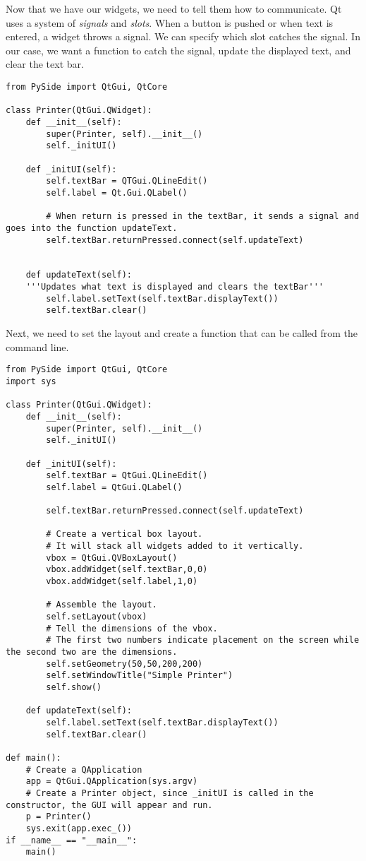 Now that we have our widgets, we need to tell them how to communicate.
Qt uses a system of \emph{signals} and \emph{slots}.
When a button is pushed or when text is entered, a widget throws a signal.
We can specify which slot catches the signal.
In our case, we want a function to catch the signal, update the displayed text, and clear the text bar.

\begin{lstlisting}
from PySide import QtGui, QtCore

class Printer(QtGui.QWidget):
	def __init__(self):
		super(Printer, self).__init__()
		self._initUI()

	def _initUI(self):
		self.textBar = QTGui.QLineEdit()
		self.label = Qt.Gui.QLabel()
		
		# When return is pressed in the textBar, it sends a signal and goes into the function updateText.
		self.textBar.returnPressed.connect(self.updateText)
	
		
	def updateText(self):
	'''Updates what text is displayed and clears the textBar'''
		self.label.setText(self.textBar.displayText())
		self.textBar.clear()

\end{lstlisting}

Next, we need to set the layout and create a function that can be called from the command line.

\begin{lstlisting}
from PySide import QtGui, QtCore
import sys

class Printer(QtGui.QWidget):
	def __init__(self):
		super(Printer, self).__init__()
		self._initUI()

	def _initUI(self):
		self.textBar = QtGui.QLineEdit()
		self.label = QtGui.QLabel()
		
		self.textBar.returnPressed.connect(self.updateText)
	
		# Create a vertical box layout. 
		# It will stack all widgets added to it vertically.
		vbox = QtGui.QVBoxLayout()
		vbox.addWidget(self.textBar,0,0)
		vbox.addWidget(self.label,1,0)
		
		# Assemble the layout.
		self.setLayout(vbox)
		# Tell the dimensions of the vbox.
		# The first two numbers indicate placement on the screen while the second two are the dimensions.
		self.setGeometry(50,50,200,200)
		self.setWindowTitle("Simple Printer")
		self.show()
	
	def updateText(self):
		self.label.setText(self.textBar.displayText())
		self.textBar.clear()
		
def main():
	# Create a QApplication
	app = QtGui.QApplication(sys.argv)
	# Create a Printer object, since _initUI is called in the constructor, the GUI will appear and run.
	p = Printer()
	sys.exit(app.exec_())
if __name__ == "__main__":
	main()

\end{lstlisting}

